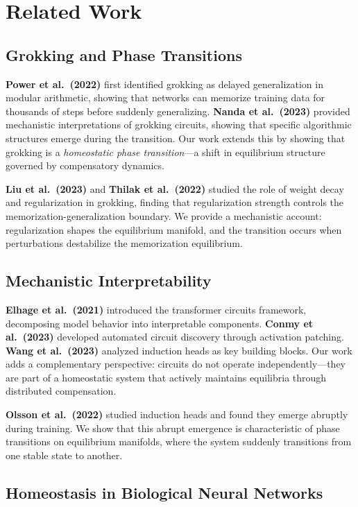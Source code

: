 \section{Related Work}\label{sec:related}

\subsection{Grokking and Phase Transitions}

\textbf{Power et al.~(2022)} first identified grokking as delayed generalization in modular arithmetic, showing that networks can memorize training data for thousands of steps before suddenly generalizing. \textbf{Nanda et al.~(2023)} provided mechanistic interpretations of grokking circuits, showing that specific algorithmic structures emerge during the transition. Our work extends this by showing that grokking is a \emph{homeostatic phase transition}—a shift in equilibrium structure governed by compensatory dynamics.

\textbf{Liu et al.~(2023)} and \textbf{Thilak et al.~(2022)} studied the role of weight decay and regularization in grokking, finding that regularization strength controls the memorization-generalization boundary. We provide a mechanistic account: regularization shapes the equilibrium manifold, and the transition occurs when perturbations destabilize the memorization equilibrium.

\subsection{Mechanistic Interpretability}

\textbf{Elhage et al.~(2021)} introduced the transformer circuits framework, decomposing model behavior into interpretable components. \textbf{Conmy et al.~(2023)} developed automated circuit discovery through activation patching. \textbf{Wang et al.~(2023)} analyzed induction heads as key building blocks. Our work adds a complementary perspective: circuits do not operate independently—they are part of a homeostatic system that actively maintains equilibria through distributed compensation.

\textbf{Olsson et al.~(2022)} studied induction heads and found they emerge abruptly during training. We show that this abrupt emergence is characteristic of phase transitions on equilibrium manifolds, where the system suddenly transitions from one stable state to another.

\subsection{Homeostasis in Biological Neural Networks}

